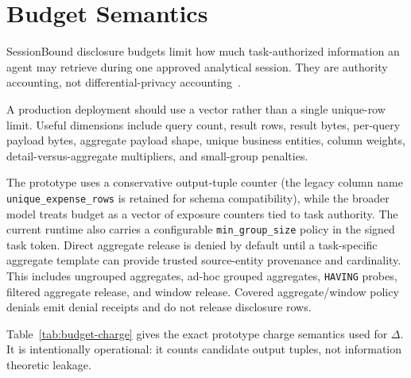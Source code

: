 \documentclass[journal]{IEEEtran}
\newcounter{algorithm}
\begin{document}
\hypertarget{budget-semantics}{%
\section{Budget Semantics}\label{budget-semantics}}

SessionBound disclosure budgets limit how much task-authorized
information an agent may retrieve during one approved analytical
session. They are authority accounting, not
differential-privacy accounting~\cite{dwork2014algorithmic}.

A production deployment should use a vector rather than a single
unique-row limit. Useful dimensions include query count, result rows,
result bytes, per-query payload bytes, aggregate payload shape, unique
business entities, column weights, detail-versus-aggregate multipliers,
and small-group penalties.

The prototype uses a conservative output-tuple counter (the legacy
column name \texttt{unique\_expense\_rows} is retained for schema
compatibility), while the broader model treats budget as a vector of
exposure counters tied to task authority. The current runtime also carries a configurable
\texttt{min\_group\_size} policy in the signed task token. Direct aggregate
release is denied by default until a task-specific aggregate template can
provide trusted source-entity provenance and cardinality. This includes
ungrouped aggregates, ad-hoc grouped aggregates, \texttt{HAVING} probes,
filtered aggregate release, and window release. Covered aggregate/window
policy denials emit denial receipts and do not release disclosure rows.

Table~\ref{tab:budget-charge} gives the exact prototype charge
semantics used for \(\Delta\). It is intentionally operational: it
counts candidate output tuples, not information
theoretic leakage.
\end{document}
